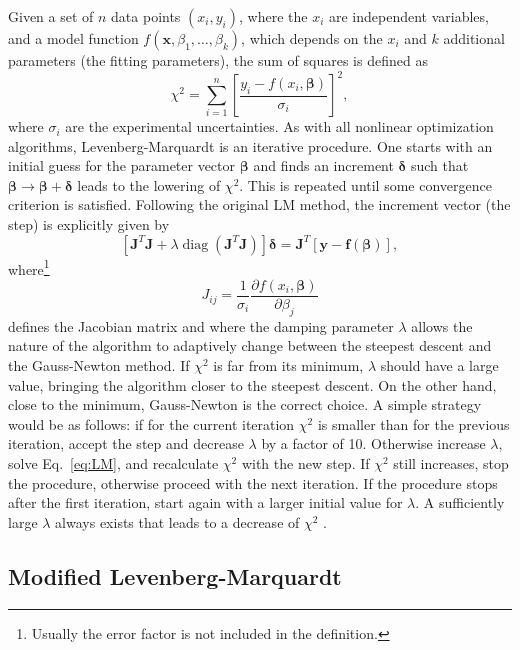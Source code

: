 \documentclass{article}
\DeclareMathOperator{\diag}{diag}
\begin{document}
Given a set of $n$ data points $(x_i,y_i)$, where the $x_i$ are independent variables, and a model function $f(\bm x, \beta_1, \ldots, \beta_k)$, which depends on the $x_i$ and $k$ additional parameters (the fitting parameters), the sum of squares is defined as
\begin{equation}
  \label{eq:chi2}
  \chi^2 = \sum_{i=1}^n \left[ \frac{y_i - f(x_i, \bm\beta)}{\sigma_i}
  \right]^2,
\end{equation}
where $\sigma_i$ are the experimental uncertainties. As with all nonlinear optimization algorithms, Levenberg-Marquardt is an iterative procedure. One starts with an initial guess for the parameter vector $\bm\beta$ and finds an increment $\bm\delta$ such that $\bm\beta \rightarrow \bm\beta + \bm\delta$ leads to the lowering of $\chi^2$. This is repeated until some convergence criterion is satisfied. Following the original LM method, the increment vector (the step) is explicitly given by
\begin{equation}
  \label{eq:LM}
  \left[\bm J^T \bm J + \lambda\diag \left(\bm J^T \bm J\right)
  \right] \bm\delta = \bm J^T \left[ \bm y - \bm f(\bm \beta) \right],
\end{equation}
where\footnote{Usually the error factor is not included in the
  definition.}
\begin{equation}
  \label{eq:Jacob}
  J_{ij} = \frac{1}{\sigma_i} \frac{\partial f(x_i, \bm \beta)}
  {\partial \beta_j}
\end{equation}
defines the Jacobian matrix and where the damping parameter $\lambda$ allows the nature of the algorithm to adaptively change between the steepest descent and the Gauss-Newton method. If $\chi^2$ is far from its minimum, $\lambda$ should have a large value, bringing the algorithm closer to the steepest descent. On the other hand, close to the minimum, Gauss-Newton is the correct choice. A simple strategy would be as follows: if for the current iteration $\chi^2$ is smaller than for the previous iteration, accept the step and decrease $\lambda$ by a factor of 10. Otherwise increase $\lambda$, solve Eq.~\eqref{eq:LM}, and recalculate $\chi^2$ with the new step. If $\chi^2$ still increases, stop the procedure, otherwise proceed with the next iteration. If the procedure stops after the first iteration, start again with a larger initial value for $\lambda$. A sufficiently large $\lambda$ always exists that leads to a decrease of $\chi^2$ \cite{marquardt63}.

\subsection{\label{sec:mod_lm}Modified Levenberg-Marquardt}
\end{document}
